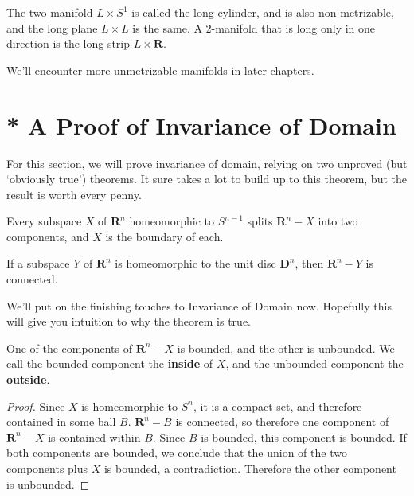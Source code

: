 \begin{example}
    The two-manifold $L \times S^1$ is called the long cylinder, and is also non-metrizable, and the long plane $L \times L$ is the same. A 2-manifold that is long only in one direction is the long strip $L \times \mathbf{R}$.
\end{example}

We'll encounter more unmetrizable manifolds in later chapters.




















\section{* A Proof of Invariance of Domain}

For this section, we will prove invariance of domain, relying on two unproved (but `obviously true') theorems. It sure takes a lot to build up to this theorem, but the result is worth every penny.

\begin{theorem}
    Every subspace $X$ of $\mathbf{R}^n$ homeomorphic to $S^{n-1}$ splits $\mathbf{R}^n - X$ into two components, and $X$ is the boundary of each.
\end{theorem}

\begin{theorem}
    If a subspace $Y$ of $\mathbf{R}^n$ is homeomorphic to the unit disc $\mathbf{D}^n$, then $\mathbf{R}^n - Y$ is connected.
\end{theorem}

We'll put on the finishing touches to Invariance of Domain now. Hopefully this will give you intuition to why the theorem is true.

\begin{lemma}
    One of the components of $\mathbf{R}^n - X$ is bounded, and the other is unbounded. We call the bounded component the {\bf inside} of $X$, and the unbounded component the {\bf outside}.
\end{lemma}
\begin{proof}
    Since $X$ is homeomorphic to $S^n$, it is a compact set, and therefore contained in some ball $B$. $\mathbf{R}^n - B$ is connected, so therefore one component of $\mathbf{R}^n - X$ is contained within $B$. Since $B$ is bounded, this component is bounded. If both components are bounded, we conclude that the union of the two components plus $X$ is bounded, a contradiction. Therefore the other component is unbounded.
\end{proof}

